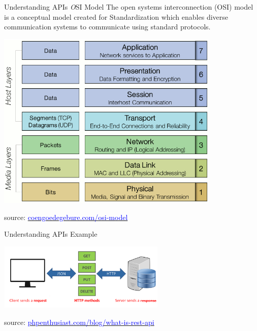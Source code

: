 \documentclass{beamer}
\begin{document}
\begin{frame}{Understanding APIs \small{\textit OSI Model}}
	\small {The open systems interconnection (OSI) model is a conceptual model created for Standardization which enables diverse communication systems to communicate using standard protocols.} 
	\begin{center}
    		\includegraphics[width=0.8\textwidth, height=0.6\textheight]{img/osi-model.png}
  \end{center}
  \tiny { source: \href{https://www.coengoedegebure.com/osi-model}{\textcolor{blue}{coengoedegebure.com/osi-model}}}
\end{frame}

\begin{frame}{Understanding APIs \small Example}
	\begin{center}
    		\includegraphics[width=0.6\textwidth, height=0.4\textheight]{img/api-client-to-server.png}
  \end{center}
  
  \tiny { source: \href{https://phpenthusiast.com/blog/what-is-rest-api}{\textcolor{blue}{phpenthusiast.com/blog/what-is-rest-api}}}
\end{frame}
\end{document}
